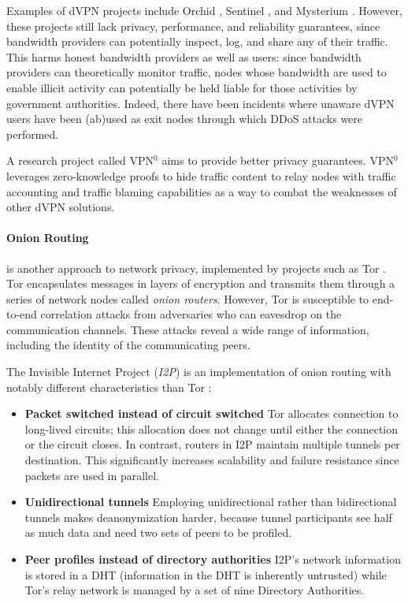 Examples of dVPN projects include Orchid \cite{orchid}, Sentinel \cite{sentinel}, and Mysterium \cite{mysterium}. However, these projects still lack privacy, performance, and reliability guarantees, since bandwidth providers can potentially inspect, log, and share any of their traffic. This harms honest bandwidth providers as well as users: since bandwidth providers can theoretically monitor traffic, nodes whose bandwidth are used to enable illicit activity can potentially be held liable for those activities by government authorities. Indeed, there have been incidents where unaware dVPN users have been (ab)used as exit nodes through which DDoS attacks
were performed.

A research project called VPN$^0$ \cite{vpn0} aims to provide better privacy guarantees. VPN$^0$ leverages zero-knowledge proofs to hide traffic content to relay nodes with traffic accounting and traffic blaming capabilities as a way to combat the weaknesses of other dVPN solutions.

\paragraph{Onion Routing} is another approach to network privacy, implemented by projects such as Tor \cite{tor}. Tor encapsulates messages in layers of encryption and transmits them through a series of network nodes called \textit{onion routers}. However, Tor is susceptible to end-to-end correlation attacks from adversaries who can eavesdrop on the communication channels. These attacks reveal a wide range of information, including the identity of the communicating peers.

The Invisible Internet Project (\textit{I2P}) is an implementation of onion routing with notably different characteristics than Tor \cite{i2p}:

\begin{itemize}

      \item \textbf{Packet switched instead of circuit switched}
            Tor allocates connection to long-lived circuits; this allocation does not change until either the connection or the circuit closes. In contrast, routers in I2P maintain multiple tunnels per destination. This significantly increases scalability and failure resistance since packets are used in parallel.

      \item \textbf{Unidirectional tunnels}
            Employing unidirectional rather than bidirectional tunnels makes deanonymization harder, because tunnel participants see half as much data and need two sets of peers to be profiled.

      \item \textbf{Peer profiles instead of directory authorities}
            I2P’s network information is stored in a DHT (information in the DHT is inherently untrusted) while Tor’s relay network is managed by a set of nine Directory Authorities.
\end{itemize}

